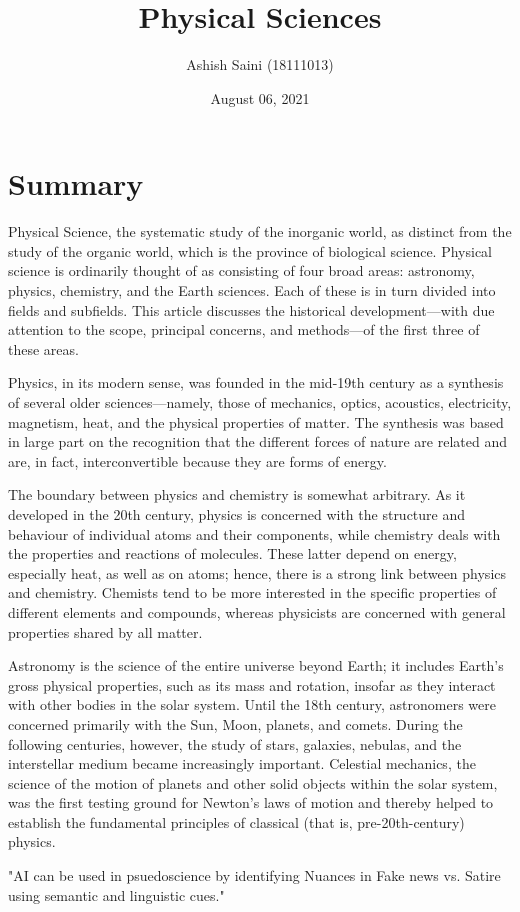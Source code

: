 \documentclass[12pt]{article}
\begin{document}
\title{Physical Sciences}
\author{Ashish Saini (18111013)}
\date{August 06, 2021}
\maketitle



\section{Summary}

Physical Science, the systematic study of the inorganic world, as distinct from the study of the organic world, which is the province of biological science. Physical science is ordinarily thought of as consisting of four broad areas: astronomy, physics, chemistry, and the Earth sciences. Each of these is in turn divided into fields and subfields. This article discusses the historical development—with due attention to the scope, principal concerns, and methods—of the first three of these areas.\par

Physics, in its modern sense, was founded in the mid-19th century as a synthesis of several older sciences—namely, those of mechanics, optics, acoustics, electricity, magnetism, heat, and the physical properties of matter. The synthesis was based in large part on the recognition that the different forces of nature are related and are, in fact, interconvertible because they are forms of energy.

 \par

The boundary between physics and chemistry is somewhat arbitrary. As it developed in the 20th century, physics is concerned with the structure and behaviour of individual atoms and their components, while chemistry deals with the properties and reactions of molecules. These latter depend on energy, especially heat, as well as on atoms; hence, there is a strong link between physics and chemistry. Chemists tend to be more interested in the specific properties of different elements and compounds, whereas physicists are concerned with general properties shared by all matter.  
\par

Astronomy is the science of the entire universe beyond Earth; it includes Earth’s gross physical properties, such as its mass and rotation, insofar as they interact with other bodies in the solar system. Until the 18th century, astronomers were concerned primarily with the Sun, Moon, planets, and comets. During the following centuries, however, the study of stars, galaxies, nebulas, and the interstellar medium became increasingly important. Celestial mechanics, the science of the motion of planets and other solid objects within the solar system, was the first testing ground for Newton’s laws of motion and thereby helped to establish the fundamental principles of classical (that is, pre-20th-century) physics. \par

\begin{center}
"AI can be used in psuedoscience by identifying Nuances in Fake news vs. Satire using semantic and linguistic cues."
\end{center}
\end{document}
